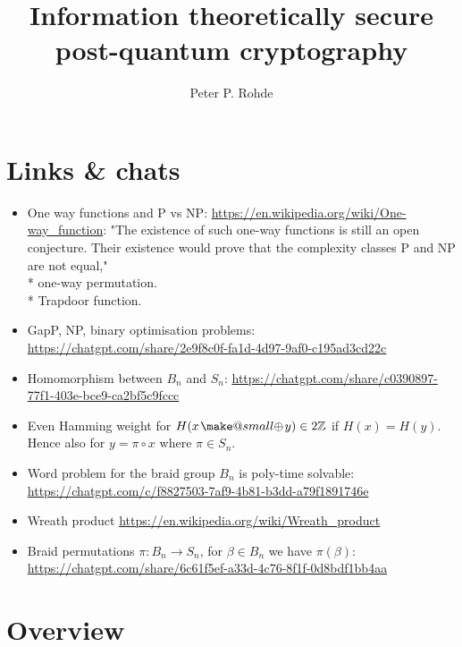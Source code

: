 \documentclass[twocolumn, aps, amsmath, amssymb, nofootinbib, superscriptaddress, longbibliography, doublefloatfix, table-of-contents, eqsecnum, rmp]{revtex4-2}
\makeatletter
\newcommand{\soplus}{{{\hspace{1pt}}{\mathbin{\mathpalette\make@small{\mathbin\oplus}}}}{\hspace{1pt}}}
\newcommand{\make@small}[2]{%
  \vcenter{\hbox{%
    \scalebox{0.6}{$\m@th#1#2$}%
  }}%
}
\makeatother
\begin{document}
\title{Information theoretically secure post-quantum cryptography}

\author{Peter P. Rohde}

\begin{abstract}
\end{abstract}

\maketitle

\tableofcontents

\section{Links \& chats}

\begin{itemize}
	\item One way functions and P vs NP: \url{https://en.wikipedia.org/wiki/One-way_function}: "The existence of such one-way functions is still an open conjecture. Their existence would prove that the complexity classes P and NP are not equal,"\\
		* one-way permutation.\\
		* Trapdoor function.\\
	\item GapP, NP, binary optimisation problems: \url{https://chatgpt.com/share/2e9f8c0f-fa1d-4d97-9af0-c195ad3cd22c}
	\item Homomorphism between $B_n$ and $S_n$: \url{https://chatgpt.com/share/c0390897-77f1-403e-bce9-ca2bf5c9fccc}
	\item Even Hamming weight for $H(x\soplus y)\in 2\mathbb{Z}$ if $H(x)=H(y)$. Hence also for $y=\pi\circ x$ where $\pi\in S_n$.
	\item Word problem for the braid group $B_n$ is poly-time solvable: \url{https://chatgpt.com/c/f8827503-7af9-4b81-b3dd-a79f1891746e}
	\item Wreath product \url{https://en.wikipedia.org/wiki/Wreath_product}
	\item Braid permutations \mbox{$\pi: B_n \to S_n$}, for $\beta\in B_n$ we have $\pi(\beta)$: \url{https://chatgpt.com/share/6c61f5ef-a33d-4c76-8f1f-0d8bdf1bb4aa}
\end{itemize}

\section{Overview}
\end{document}
